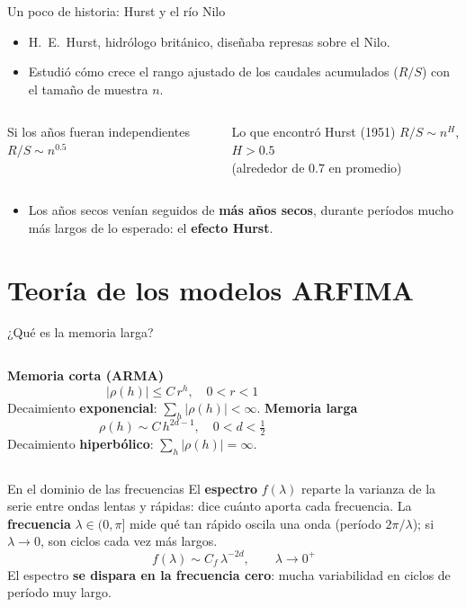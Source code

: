 \documentclass[aspectratio=169,11pt]{beamer}
\newcommand{\destacar}[1]{\textcolor{udeaverde}{\textbf{#1}}}
\begin{document}
\begin{frame}{Un poco de historia: Hurst y el río Nilo}
\begin{itemize}
\item H.~E.~Hurst, hidrólogo británico, diseñaba represas sobre el Nilo.
\item Estudió cómo crece el rango ajustado de los caudales acumulados ($R/S$) con el tamaño de muestra $n$.
\end{itemize}
\vspace{0.3cm}
\begin{columns}[T]
\begin{block}{Si los años fueran independientes}
\centering $R/S \sim n^{0.5}$
\end{block}
\begin{alertblock}{Lo que encontró Hurst (1951)}
\centering $R/S \sim n^{H}$, \quad $H > 0.5$\\ (alrededor de 0.7 en promedio)
\end{alertblock}
\end{columns}
\vspace{0.3cm}
\begin{itemize}
\item Los años secos venían seguidos de \destacar{más años secos}, durante períodos mucho más largos de lo esperado: el \destacar{efecto Hurst}.
\end{itemize}
\end{frame}

\section{Teoría de los modelos ARFIMA}
\begin{frame}{¿Qué es la memoria larga?}
\begin{columns}[T]
\textbf{Memoria corta (ARMA)}
\[
|\rho(h)| \le C\,r^{h}, \quad 0<r<1
\]
Decaimiento \destacar{exponencial}: $\sum_h |\rho(h)| < \infty$.
\textbf{Memoria larga}
\[
\rho(h) \sim C\,h^{2d-1}, \quad 0<d<\tfrac12
\]
Decaimiento \destacar{hiperbólico}: $\sum_h |\rho(h)| = \infty$.
\end{columns}
\vspace{0.4cm}
\begin{block}{En el dominio de las frecuencias}
\small El \textbf{espectro} $f(\lambda)$ reparte la varianza de la serie entre ondas lentas y rápidas: dice cuánto aporta cada frecuencia. La \textbf{frecuencia} $\lambda \in (0,\pi]$ mide qué tan rápido oscila una onda (período $2\pi/\lambda$); si $\lambda \to 0$, son ciclos cada vez más largos.
\normalsize
\[
f(\lambda) \sim C_f\,\lambda^{-2d}, \qquad \lambda \to 0^{+}
\]
El espectro \textbf{se dispara en la frecuencia cero}: mucha variabilidad en ciclos de período muy largo.
\end{block}
\end{frame}
\end{document}
